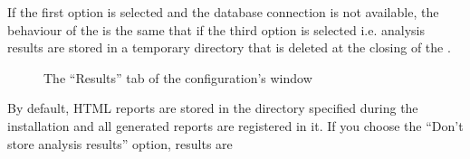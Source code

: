 \begin{itemize}
\begin{itemize}
{        If the first option is selected and the database connection is not
        available, the behaviour of the \ma is the same that if the third option
        is selected i.e. analysis results are stored in a temporary directory
        that is deleted at the closing of the \ma.
        \begin{figure}[ht]
			\begin{center}
			\end{center}
			\caption{The ``Results'' tab of the configuration's window}
			\label{ResultsTabOfConfigDialog}
	   	\end{figure}
      }{
       By default, HTML reports are stored in the directory specified during the
       installation and all generated reports are registered in it. If you 
       choose the ``Don't store analysis results'' option, results are 
}
\end{itemize}
\end{itemize}
